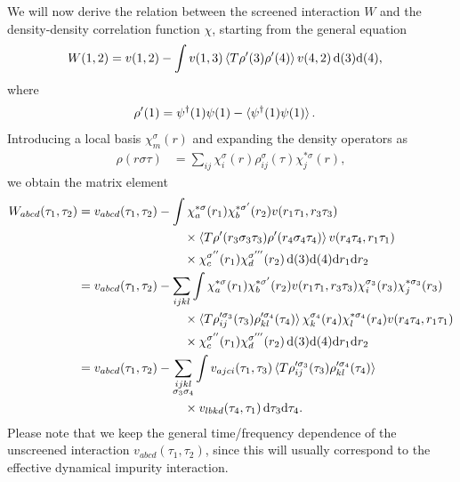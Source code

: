 \documentclass[12pt,a4paper]{scrartcl}
\numberwithin{equation}{section}
\begin{document}
We will now derive the relation between the screened interaction $W$ and the density-density
correlation function $\chi$, starting from the general equation
\begin{align}
W(1,2)
&=v(1,2) - \int v(1,3) \braket{T\rho'(3)\rho'(4)} v(4,2) \, \mathrm{d}(3)\mathrm{d}(4), 
\end{align}
where
\begin{align}
 \rho'(1) &= \psi^{\dagger}(1)\psi(1) - \braket{ \psi^{\dagger}(1)\psi(1) }.
\end{align}
Introducing a local basis $\chi^{\sigma}_m(r)$ and expanding the density operators as
\begin{align}
\rho(r\sigma\tau) &= \sum_{ij} \chi^{\sigma}_i(r) \rho^{\sigma}_{ij}(\tau) \chi^{*\sigma}_j(r),
\end{align}
we obtain the matrix element
\begin{align}
W_{abcd}(\tau_1,\tau_2) 
&= v_{abcd}(\tau_1,\tau_2)  
- \int \chi^{*\sigma}_a(r_1)\chi^{*\sigma'}_b(r_2) v(r_1\tau_1,r_3\tau_3)   \nonumber \\
            & \hspace{3cm} \times \braket{T\rho'(r_3\sigma_3\tau_3)\rho'(r_4\sigma_4\tau_4)}
                            v(r_4\tau_4,r_1\tau_1) \nonumber \\
            &\hspace{3cm} \times \chi^{\sigma''}_c(r_1)\chi^{\sigma'''}_d(r_2)
                                             \, \mathrm{d}(3)\mathrm{d}(4) \mathrm{d}r_1 \mathrm{d}r_2 \\
%
&= v_{abcd}(\tau_1,\tau_2)  
- \sum_{ijkl}\int \chi^{*\sigma}_a(r_1)\chi^{*\sigma'}_b(r_2)
                                    v(r_1\tau_1,r_3\tau_3) \chi^{\sigma_3}_i(r_3) \chi^{*\sigma_3}_j(r_3) \nonumber\\
               &\hspace{3cm} \times   \braket{T\rho'^{\sigma_3}_{ij}(\tau_3)\rho'^{\sigma_4}_{kl}(\tau_4)}
                            \chi^{\sigma_4}_k(r_4) \chi^{*\sigma_4}_l(r_4)
                            v(r_4\tau_4,r_1\tau_1)                                         \nonumber \\
               &\hspace{3cm} \times  \chi^{\sigma''}_c(r_1)\chi^{\sigma'''}_d(r_2)
                                                        \, \mathrm{d}(3)\mathrm{d}(4) \mathrm{d}r_1 \mathrm{d}r_2 \\
%
&= v_{abcd}(\tau_1,\tau_2)  
- \sum_{\substack{ijkl\\ \sigma_3\sigma_4}}\int v_{ajci}(\tau_1,\tau_3)  \braket{T\rho'^{\sigma_3}_{ij}(\tau_3)\rho'^{\sigma_4}_{kl}(\tau_4)}    \nonumber\\
               &\hspace{3cm} \times   v_{lbkd}(\tau_4,\tau_1)   \, \mathrm{d}\tau_3 \mathrm{d}\tau_4 .
\end{align}
Please note that we keep the general time/frequency dependence of the unscreened interaction
$v_{abcd}(\tau_1,\tau_2)$, since this will usually correspond to the effective dynamical
impurity interaction.
\end{document}
